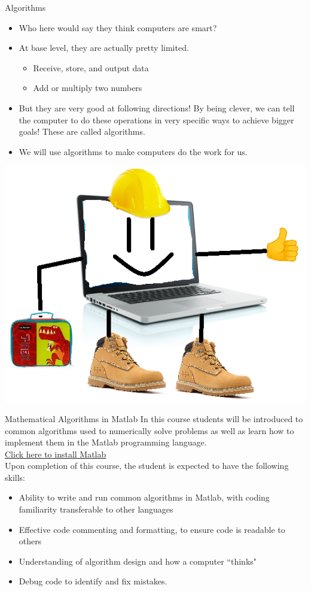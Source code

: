 {}\documentclass[letterpaper,
compress,
xcolor=x11names,
]{beamer}
\begin{document}
\begin{frame}{Algorithms}
	\footnotesize
	\begin{itemize}
		\item Who here would say they think computers are smart?
		\item At base level, they are actually pretty limited.
		\begin{itemize}
			\item Receive, store, and output data
			\item Add or multiply two numbers
		\end{itemize}
		\item But they are very good at following directions! By being clever, we can tell the computer to do these operations in very specific ways to achieve bigger goals! These are called algorithms.
		\item We will use algorithms to make computers do the work for us.
	\end{itemize}
	\begin{center}
		\includegraphics[width = 0.5\linewidth]{computer_work.png}
	\end{center}
\end{frame}
\begin{frame}{Mathematical Algorithms in Matlab}
	\footnotesize
	\noindent In this course students will be introduced to common algorithms used to numerically solve problems as well as learn how to implement them in the Matlab programming language. \\ 
	\bigskip
	\textcolor{blue}{\href{https://www.mathworks.com/academia/tah-portal/colorado-state-university-40638290.html}{Click here to install Matlab}} \\
	\bigskip
	\noindent Upon completion of this course, the student is expected to have the following skills:
	\begin{itemize}
		\item Ability to write and run common algorithms in Matlab, with coding familiarity transferable to other languages
		\item Effective code commenting and formatting, to ensure code is readable to others
		\item Understanding of algorithm design and how a computer ``thinks"
		\item Debug code to identify and fix mistakes.
	\end{itemize}	
	
\end{frame}
\end{document}
